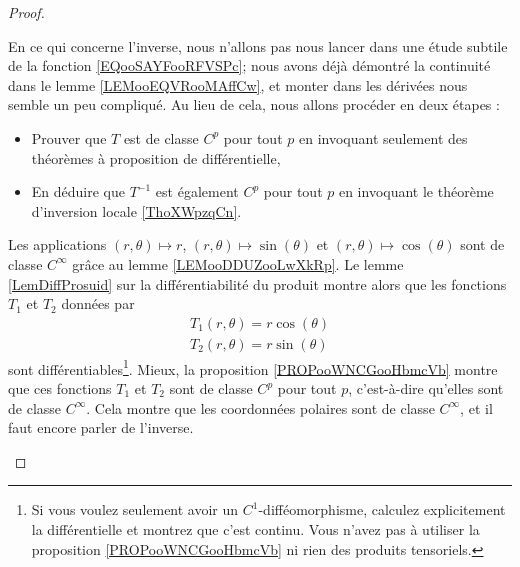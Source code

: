 \begin{proof}
\begin{enumerate}
		      En ce qui concerne l'inverse, nous n'allons pas nous lancer dans une étude subtile de la fonction \eqref{EQooSAYFooRFVSPc}; nous avons déjà démontré la continuité dans le lemme \ref{LEMooEQVRooMAffCw}, et monter dans les dérivées nous semble un peu compliqué. Au lieu de cela, nous allons procéder en deux étapes :
		      \begin{itemize}
			      \item Prouver que \( T\) est de classe \( C^p\) pour tout \( p\) en invoquant seulement des théorèmes à proposition de différentielle,
			      \item
			            En déduire que \( T^{-1}\) est également \( C^p\) pour tout \( p\) en invoquant le théorème d'inversion locale \ref{ThoXWpzqCn}.
		      \end{itemize}

		      Les applications \( (r,\theta)\mapsto r\), \( (r,\theta)\mapsto \sin(\theta)\) et \( (r,\theta)\mapsto \cos(\theta)\) sont de classe \(  C^{\infty}\) grâce au lemme \ref{LEMooDDUZooLwXkRp}. Le lemme \ref{LemDiffProsuid} sur la différentiabilité du produit montre alors que les fonctions \( T_1\) et \( T_2\) données par
		      \begin{subequations}
			      \begin{align}
				      T_1(r,\theta)=r\cos(\theta) \\
				      T_2(r,\theta)=r\sin(\theta)
			      \end{align}
		      \end{subequations}
		      sont différentiables\footnote{Si vous voulez seulement avoir un \( C^1\)-difféomorphisme, calculez explicitement la différentielle et montrez que c'est continu. Vous n'avez pas à utiliser la proposition \ref{PROPooWNCGooHbmcVb} ni rien des produits tensoriels.}. Mieux, la proposition \ref{PROPooWNCGooHbmcVb} montre que ces fonctions \( T_1\) et \( T_2\) sont de classe \( C^p\) pour tout \( p\), c'est-à-dire qu'elles sont de classe \(  C^{\infty}\). Cela montre que les coordonnées polaires sont de classe \(  C^{\infty}\), et il faut encore parler de l'inverse.


\end{enumerate}
\end{proof}
